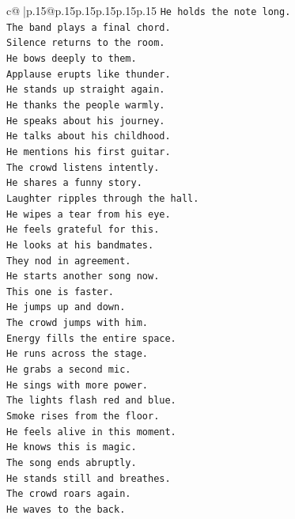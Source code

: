 \documentclass{article}
\begin{document}
{\begin{supertabular}{c@{$\;$}|p{.15\linewidth}@{}p{.15\linewidth}p{.15\linewidth}p{.15\linewidth}p{.15\linewidth}p{.15\linewidth}}
{{{\texttt{He holds the note long.} \\
\texttt{The band plays a final chord.} \\
\texttt{Silence returns to the room.} \\
\texttt{He bows deeply to them.} \\
\texttt{Applause erupts like thunder.} \\
\texttt{He stands up straight again.} \\
\texttt{He thanks the people warmly.} \\
\texttt{He speaks about his journey.} \\
\texttt{He talks about his childhood.} \\
\texttt{He mentions his first guitar.} \\
\texttt{The crowd listens intently.} \\
\texttt{He shares a funny story.} \\
\texttt{Laughter ripples through the hall.} \\
\texttt{He wipes a tear from his eye.} \\
\texttt{He feels grateful for this.} \\
\texttt{He looks at his bandmates.} \\
\texttt{They nod in agreement.} \\
\texttt{He starts another song now.} \\
\texttt{This one is faster.} \\
\texttt{He jumps up and down.} \\
\texttt{The crowd jumps with him.} \\
\texttt{Energy fills the entire space.} \\
\texttt{He runs across the stage.} \\
\texttt{He grabs a second mic.} \\
\texttt{He sings with more power.} \\
\texttt{The lights flash red and blue.} \\
\texttt{Smoke rises from the floor.} \\
\texttt{He feels alive in this moment.} \\
\texttt{He knows this is magic.} \\
\texttt{The song ends abruptly.} \\
\texttt{He stands still and breathes.} \\
\texttt{The crowd roars again.} \\
\texttt{He waves to the back.} \\
}}}
\end{supertabular}}
\end{document}
